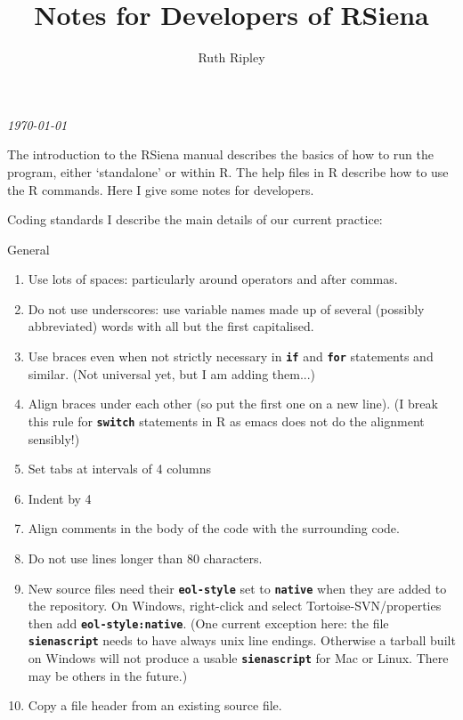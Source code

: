 \documentclass[12pt, a4paper]{article}
\makeatletter
\renewcommand{\=}{\,=\,}
\newcommand{\+}{\,+\,}
\newcommand{\sfn}[1]{\textbf{\texttt{#1}}}
\renewcommand{\section}{\@startsection{section}{1}
                {0pt}{\baselineskip}{0.5\baselineskip}
                {\centering\sffamily} }
\renewcommand{\subsection}{\@startsection{subsection}{2}
                {0pt}{0.7\baselineskip}{0.3\baselineskip}
                {\sffamily} }
\makeatother
\begin{document}
\title{Notes for Developers of RSiena}
\author{Ruth Ripley}
\date{}
\maketitle

\centerline{\emph{\today}}
\bigskip

The introduction to the RSiena manual describes the basics of how to run the
program, either `standalone' or within R. The help files in R describe how to
use the R commands. Here I give some notes for developers.
\section{Coding standards}
I describe the main details of our current practice:
\subsection{General}
\begin{enumerate}
\item Use lots of spaces: particularly around operators and after commas.
\item Do not use underscores: use variable names made up of several (possibly
  abbreviated) words with all but the first capitalised.
\item Use braces even when not strictly necessary in \sfn{if} and \sfn{for}
  statements and similar. (Not universal yet, but I am adding them...)
\item Align braces under each other (so put the first one on a new line). (I
  break this rule for \sfn{switch} statements in R as emacs does not do the
  alignment sensibly!)
\item Set tabs at intervals of 4 columns
\item Indent by 4
\item Align comments in the body of the code with the surrounding code.
\item Do not use lines longer than 80 characters.
\item New source files need their \sfn{eol-style} set to \sfn{native} when they
  are added to the repository. On Windows, right-click and select
  Tortoise-SVN/properties then add \sfn{eol-style:native}.  (One current
  exception here: the file \sfn{sienascript} needs to have always unix line
  endings. Otherwise a tarball built on Windows will not produce a usable
  \sfn{sienascript} for Mac or Linux. There may be others in the future.)
\item Copy a file header from an existing source file.
\end{enumerate}
\end{document}
